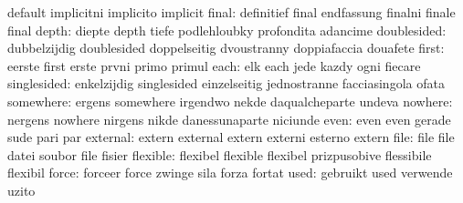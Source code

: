                            default                   implicitni
                           implicito                 implicit
                    final: definitief                final
                           endfassung                finalni
                           finale                    final
                    depth: diepte                    depth
                           tiefe                     podlehloubky
                           profondita                adancime
              doublesided: dubbelzijdig              doublesided
                           doppelseitig              dvoustranny
                           doppiafaccia              douafete
                    first: eerste                    first
                           erste                     prvni
                           primo                     primul
                     each: elk                       each
                           jede                      kazdy
                           ogni                      fiecare
              singlesided: enkelzijdig               singlesided
                           einzelseitig              jednostranne
                           facciasingola             ofata
                somewhere: ergens                    somewhere
                           irgendwo                  nekde
                           daqualcheparte            undeva
                  nowhere: nergens                   nowhere
                           nirgens                   nikde
                           danessunaparte            niciunde
                     even: even                      even
                           gerade                    sude
                           pari                      par
                 external: extern                    external
                           extern                    externi
                           esterno                   extern
                     file: file                      file
                           datei                     soubor
                           file                      fisier
                 flexible: flexibel                  flexible
                           flexibel                  prizpusobive
                           flessibile                flexibil
                    force: forceer                   force
                           zwinge                    sila
                           forza                     fortat
                     used: gebruikt                  used
                           verwende                  uzito
